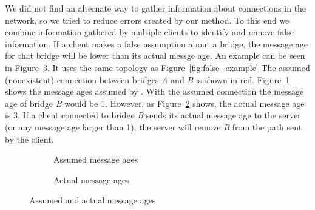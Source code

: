 We did not find an alternate way to gather information about connections in the network, so we tried to reduce errors created by our method.
To this end we combine information gathered by multiple clients to identify and remove false information.
If a client makes a false assumption about a bridge, the message age for that bridge will be lower than its actual messge age.
An example can be seen in Figure~\ref{fig:message_ages}.
It uses the same topology as Figure~\ref{fig:false_example}
The assumed (nonexistent) connection between bridges \textit{A} and \textit{B} is shown in red.
Figure~\ref{fig:message_ages1} shows the message ages assumed by \tool.
With the assumed connection the message age of bridge \textit{B} would be 1.
However, as Figure~\ref{fig:message_ages2} shows, the actual message age is 3.
If a client connected to bridge \textit{B} sends its actual message age to the server (or any message age larger than 1), the server will remove \textit{B} from the path sent by the client.
\begin{figure}[h]
    \begin{subfigure}[b]{0.4\textwidth}
        \caption{Assumed message ages}
        \label{fig:message_ages1}
    \end{subfigure}
    \hspace{1cm}
    \begin{subfigure}[b]{0.4\textwidth}
        \caption{Actual message ages}
        \label{fig:message_ages2}
    \end{subfigure}

    \caption{Assumed and actual message ages}
    \label{fig:message_ages}
\end{figure}

